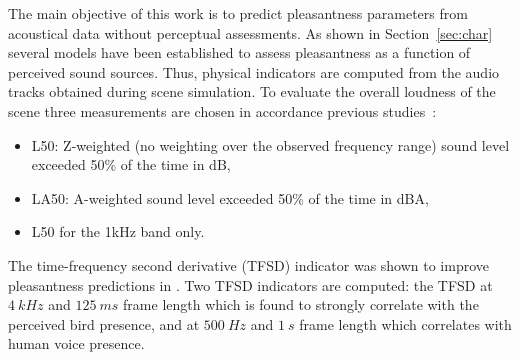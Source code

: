 \documentclass{article}
\begin{document}
\begin{sloppy}
The main objective of this work is to predict pleasantness parameters from acoustical data without perceptual assessments. As shown in Section~\ref{sec:char} several models have been established to assess pleasantness as a function of perceived sound sources. Thus, physical indicators are computed from the audio tracks obtained during scene simulation. To evaluate the overall loudness of the scene three measurements are chosen in accordance previous studies~\cite{decoensel2006, ricciardi2014, aumond2017}:
\begin{itemize}
\item L50: Z-weighted (no weighting over the observed frequency range) sound level exceeded 50\% of the time in dB,
\item LA50: A-weighted sound level exceeded 50\% of the time in dBA,
\item L50 for the 1kHz band only.
\end{itemize}
The time-frequency second derivative (TFSD) indicator was shown to improve pleasantness predictions in \cite{aumond2017}. Two TFSD indicators are computed: the TFSD at $4~kHz$ and $125~ms$ frame length which is found to strongly correlate with the perceived bird presence, and at $500~Hz$ and $1~s$ frame length which correlates with human voice presence.


\end{sloppy}
\end{document}
